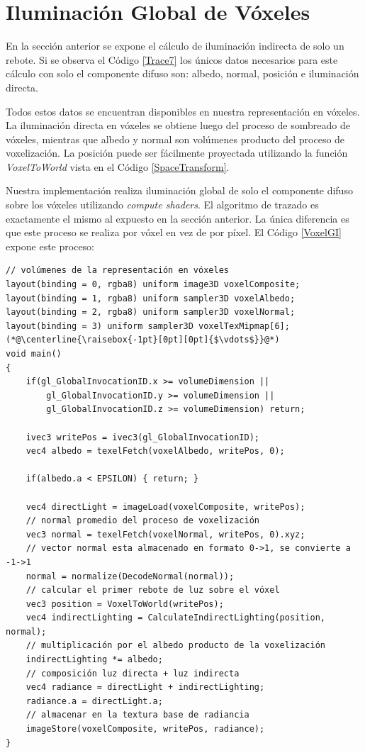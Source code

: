 \section{Iluminación Global de Vóxeles} %
\label{sec:iluminacion_global_de_voxeles_impl}
En la sección anterior se expone el cálculo de iluminación indirecta de solo un rebote. Si se observa el Código \ref{Trace7} los únicos datos necesarios para este cálculo con solo el componente difuso son: albedo, normal, posición e iluminación directa.

Todos estos datos se encuentran disponibles en nuestra representación en vóxeles. La iluminación directa en vóxeles se obtiene luego del proceso de sombreado de vóxeles, mientras que albedo y normal son volúmenes producto del proceso de voxelización. La posición puede ser fácilmente proyectada utilizando la función \emph{VoxelToWorld} vista en el Código \ref{SpaceTransform}.

Nuestra implementación realiza iluminación global de solo el componente difuso sobre los vóxeles utilizando \emph{compute shaders}. El algoritmo de trazado es exactamente el mismo al expuesto en la sección anterior. La única diferencia es que este proceso se realiza por vóxel en vez de por píxel. El Código \ref{VoxelGI} expone este proceso:
\\
\begin{lstlisting}[caption={Calculo de iluminación global sobre vóxeles.}, label=VoxelGI]
// volúmenes de la representación en vóxeles
layout(binding = 0, rgba8) uniform image3D voxelComposite;
layout(binding = 1, rgba8) uniform sampler3D voxelAlbedo;
layout(binding = 2, rgba8) uniform sampler3D voxelNormal;
layout(binding = 3) uniform sampler3D voxelTexMipmap[6];
(*@\centerline{\raisebox{-1pt}[0pt][0pt]{$\vdots$}}@*)
void main()
{
    if(gl_GlobalInvocationID.x >= volumeDimension ||
        gl_GlobalInvocationID.y >= volumeDimension ||
        gl_GlobalInvocationID.z >= volumeDimension) return;

    ivec3 writePos = ivec3(gl_GlobalInvocationID);
    vec4 albedo = texelFetch(voxelAlbedo, writePos, 0);

    if(albedo.a < EPSILON) { return; }

    vec4 directLight = imageLoad(voxelComposite, writePos);
    // normal promedio del proceso de voxelización
    vec3 normal = texelFetch(voxelNormal, writePos, 0).xyz;
    // vector normal esta almacenado en formato 0->1, se convierte a -1->1
    normal = normalize(DecodeNormal(normal));
    // calcular el primer rebote de luz sobre el vóxel
    vec3 position = VoxelToWorld(writePos);
    vec4 indirectLighting = CalculateIndirectLighting(position, normal);
    // multiplicación por el albedo producto de la voxelización
    indirectLighting *= albedo;
    // composición luz directa + luz indirecta
    vec4 radiance = directLight + indirectLighting;
    radiance.a = directLight.a;
    // almacenar en la textura base de radiancia
    imageStore(voxelComposite, writePos, radiance);
}
\end{lstlisting}

